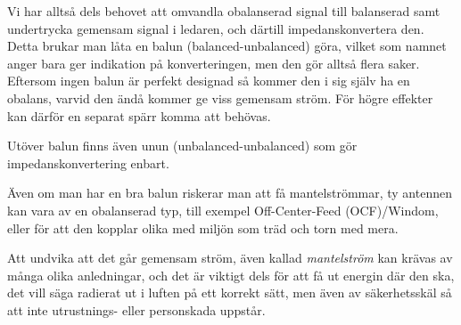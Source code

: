 Vi har alltså dels behovet att omvandla obalanserad signal till balanserad
samt undertrycka gemensam signal i ledaren, och därtill impedanskonvertera den.
Detta brukar man låta en balun (balanced-unbalanced) göra, vilket som namnet
anger bara ger indikation på konverteringen, men den gör alltså flera saker.
Eftersom ingen balun är perfekt designad så kommer den i sig själv ha en
obalans, varvid den ändå kommer ge viss gemensam ström.
För högre effekter kan därför en separat spärr komma att behövas.

Utöver balun finns även unun (unbalan\-ced-un\-balan\-ced) som gör
impedanskonvertering enbart.

Även om man har en bra balun riskerar man att få mantelströmmar, ty antennen
kan vara av en obalanserad typ, till exempel Off-Center-Feed (OCF)/Windom, eller
för att den kopplar olika med miljön som träd och torn med mera.

Att undvika att det går gemensam ström, även kallad \emph{mantelström} kan
krävas av många olika anledningar, och det är viktigt dels för att få ut
energin där den ska, det vill säga radierat ut i luften på ett korrekt sätt,
men även av säkerhetsskäl så att inte utrustnings- eller personskada uppstår.
